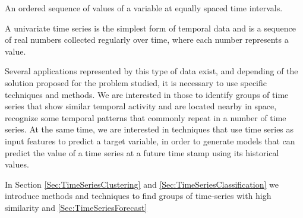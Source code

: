 \begin{definition}
	An ordered sequence of values of a variable at equally spaced time intervals. 
\end{definition}

\begin{definition}
	A univariate time series is the simplest form of temporal data and is a sequence of real numbers collected regularly over time, where each number represents a value.
\end{definition}

Several applications represented by this type of data exist, and depending of the solution proposed for the problem studied, it is necessary to use specific techniques and methods. We are interested in those to identify groups of time series that show similar temporal activity and are located nearby in space, recognize some temporal patterns that commonly repeat in a number of time series. At the same time, we are interested in techniques that use time series as input features to predict a target variable, in order to generate models that can predict the value of a time series at a future time stamp using its historical values.

%
%
%
In Section \ref{Sec:TimeSeriesClustering} and \ref{Sec:TimeSeriesClassification} we introduce methods and techniques to find groups of time-series with high similarity and \ref{Sec:TimeSeriesForecast}

